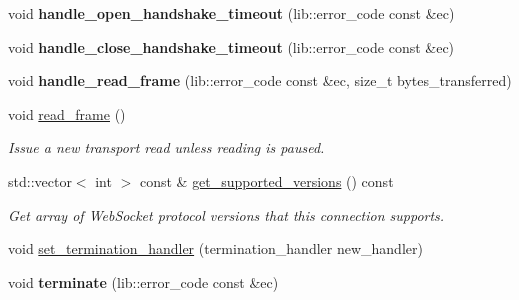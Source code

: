 \begin{DoxyCompactItemize}
\item 
void {\bfseries handle\+\_\+open\+\_\+handshake\+\_\+timeout} (lib\+::error\+\_\+code const \&ec)\hypertarget{classwebsocketpp_1_1connection_aee1b6e47985b434303b8d6e5f27177a3}{}\label{classwebsocketpp_1_1connection_aee1b6e47985b434303b8d6e5f27177a3}

\item 
void {\bfseries handle\+\_\+close\+\_\+handshake\+\_\+timeout} (lib\+::error\+\_\+code const \&ec)\hypertarget{classwebsocketpp_1_1connection_a129554b75156c82eb22b22e4409392c8}{}\label{classwebsocketpp_1_1connection_a129554b75156c82eb22b22e4409392c8}

\item 
void {\bfseries handle\+\_\+read\+\_\+frame} (lib\+::error\+\_\+code const \&ec, size\+\_\+t bytes\+\_\+transferred)\hypertarget{classwebsocketpp_1_1connection_abd6866c41c2ae86c3372cf428392a190}{}\label{classwebsocketpp_1_1connection_abd6866c41c2ae86c3372cf428392a190}

\item 
void \hyperlink{classwebsocketpp_1_1connection_af54e9d7c8ef07349d28c3405182bb3c7}{read\+\_\+frame} ()\hypertarget{classwebsocketpp_1_1connection_af54e9d7c8ef07349d28c3405182bb3c7}{}\label{classwebsocketpp_1_1connection_af54e9d7c8ef07349d28c3405182bb3c7}

\begin{DoxyCompactList}\small\item\em Issue a new transport read unless reading is paused. \end{DoxyCompactList}\item 
std\+::vector$<$ int $>$ const  \& \hyperlink{classwebsocketpp_1_1connection_a588af194b5c2a13fe692452c207e0cba}{get\+\_\+supported\+\_\+versions} () const\hypertarget{classwebsocketpp_1_1connection_a588af194b5c2a13fe692452c207e0cba}{}\label{classwebsocketpp_1_1connection_a588af194b5c2a13fe692452c207e0cba}

\begin{DoxyCompactList}\small\item\em Get array of Web\+Socket protocol versions that this connection supports. \end{DoxyCompactList}\item 
void \hyperlink{classwebsocketpp_1_1connection_ac72ff8473d0a49bb069825e99e99ca9d}{set\+\_\+termination\+\_\+handler} (termination\+\_\+handler new\+\_\+handler)
\item 
void {\bfseries terminate} (lib\+::error\+\_\+code const \&ec)\hypertarget{classwebsocketpp_1_1connection_a7267aae677a77e5e9379ecb6db1789a3}{}\label{classwebsocketpp_1_1connection_a7267aae677a77e5e9379ecb6db1789a3}


\end{DoxyCompactItemize}
